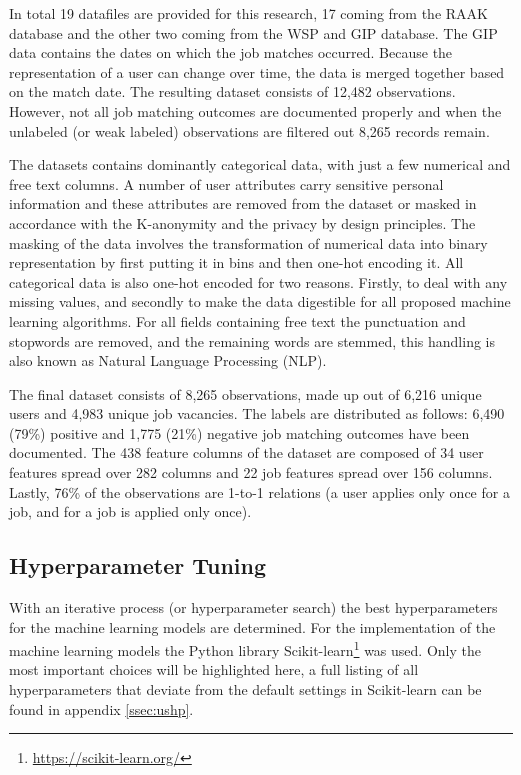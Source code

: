 In total 19 datafiles are provided for this research, 17 coming from the RAAK database and the other two coming from the WSP and GIP database.
The GIP data contains the dates on which the job matches occurred. 
Because the representation of a user can change over time, the data is merged together based on the match date. 
The resulting dataset consists of 12,482 observations.
However, not all job matching outcomes are documented properly and when the unlabeled (or weak labeled) observations are filtered out 8,265 records remain.

The datasets contains dominantly categorical data, with just a few numerical and free text columns.
A number of user attributes carry sensitive personal information and these attributes are removed from the dataset or masked in accordance with the K-anonymity \cite{sweeney2002k} and the privacy by design \cite{d2015privacy} principles.
The masking of the data involves the transformation of numerical data into binary representation by first putting it in bins and then one-hot encoding it. 
All categorical data is also one-hot encoded for two reasons. 
Firstly, to deal with any missing values, and secondly to make the data digestible for all proposed machine learning algorithms. 
For all fields containing free text the punctuation and stopwords are removed, and the remaining words are stemmed, this handling is also known as Natural Language Processing (NLP).

The final dataset consists of 8,265 observations, made up out of 6,216 unique users and 4,983 unique job vacancies. 
The labels are distributed as follows: 6,490 (79\%) positive and 1,775 (21\%) negative job matching outcomes have been documented. 
The 438 feature columns of the dataset are composed of 34 user features spread over 282 columns and 22 job features spread over 156 columns. 
Lastly, 76\% of the observations are 1-to-1 relations (a user applies only once for a job, and for a job is applied only once).

\subsection{Hyperparameter Tuning}
\label{ssec:ht}
With an iterative process (or hyperparameter search) the best hyperparameters for the machine learning models are determined. 
For the implementation of the machine learning models the Python library Scikit-learn\footnote{\url{https://scikit-learn.org/}\label{note1}} was used.
Only the most important choices will be highlighted here, a full listing of all hyperparameters that deviate from the default settings in Scikit-learn can be found in appendix \ref{ssec:ushp}.

